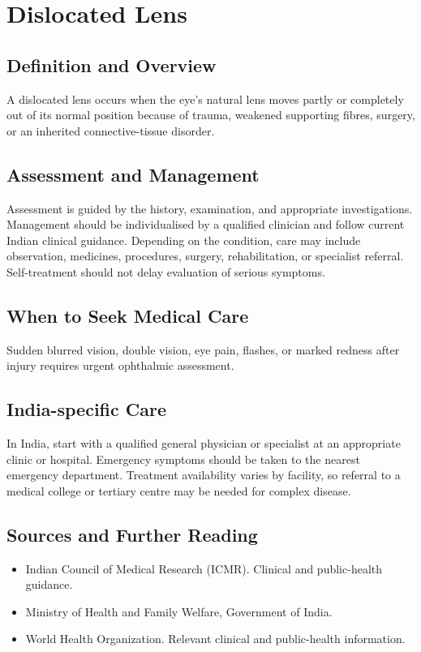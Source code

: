 \chapter{Dislocated Lens}

\section*{Definition and Overview}
A dislocated lens occurs when the eye's natural lens moves partly or completely out of its normal position because of trauma, weakened supporting fibres, surgery, or an inherited connective-tissue disorder.

\section*{Assessment and Management}
Assessment is guided by the history, examination, and appropriate investigations. Management should be individualised by a qualified clinician and follow current Indian clinical guidance. Depending on the condition, care may include observation, medicines, procedures, surgery, rehabilitation, or specialist referral. Self-treatment should not delay evaluation of serious symptoms.

\section*{When to Seek Medical Care}
Sudden blurred vision, double vision, eye pain, flashes, or marked redness after injury requires urgent ophthalmic assessment.

\section*{India-specific Care}
In India, start with a qualified general physician or specialist at an appropriate clinic or hospital. Emergency symptoms should be taken to the nearest emergency department. Treatment availability varies by facility, so referral to a medical college or tertiary centre may be needed for complex disease.

\section*{Sources and Further Reading}
\begin{itemize}
    \item Indian Council of Medical Research (ICMR). Clinical and public-health guidance.
    \item Ministry of Health and Family Welfare, Government of India.
    \item World Health Organization. Relevant clinical and public-health information.
\end{itemize}

